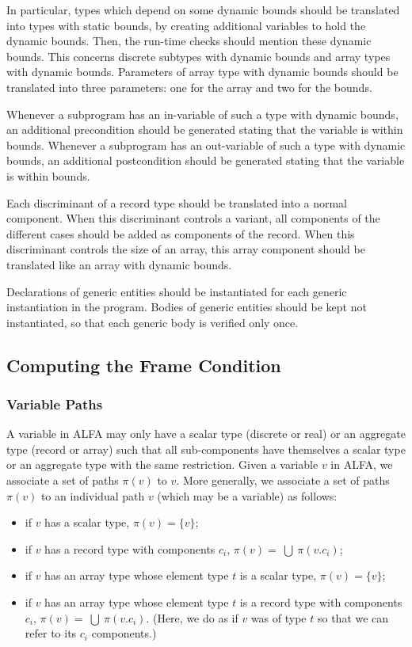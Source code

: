 \documentclass[fullpage]{article}
\newcommand{\bigunion}{~\bigcup~}
\newcommand{\vpath}[1]{\ensuremath{\pi(#1)}\xspace}
\begin{document}
In particular, types which depend on some dynamic bounds should be translated
into types with static bounds, by creating additional variables to hold the
dynamic bounds. Then, the run-time checks should mention these dynamic bounds.
This concerns discrete subtypes with dynamic bounds and array types with
dynamic bounds. Parameters of array type with dynamic bounds should be
translated into three parameters: one for the array and two for the bounds.

Whenever a subprogram has an in-variable of such a type with dynamic bounds, an
additional precondition should be generated stating that the variable is within
bounds.  Whenever a subprogram has an out-variable of such a type with dynamic
bounds, an additional postcondition should be generated stating that the
variable is within bounds.

Each discriminant of a record type should be translated into a normal
component. When this discriminant controls a variant, all components of the
different cases should be added as components of the record. When this
discriminant controls the size of an array, this array component should be
translated like an array with dynamic bounds.

Declarations of generic entities should be instantiated for each generic
instantiation in the program. Bodies of generic entities should be kept not
instantiated, so that each generic body is verified only once.

\subsection{Computing the Frame Condition}
\label{sub:data-flow}

\subsubsection{Variable Paths}
\label{sub:variable-path}

A variable in ALFA may only have a scalar type (discrete or real) or an
aggregate type (record or array) such that all sub-components have themselves a
scalar type or an aggregate type with the same restriction. Given a variable
$v$ in ALFA, we associate a set of paths \vpath{v} to $v$. More generally, we
associate a set of paths \vpath{v} to an individual path $v$ (which may be a
variable) as follows:
\begin{itemize}
\item if $v$ has a scalar type, $\vpath{v} = \{v\}$;
\item if $v$ has a record type with components $c_i$, 
  $\vpath{v} = \bigunion \vpath{v.c_i}$;
\item if $v$ has an array type whose element type $t$ is a scalar type,
  $\vpath{v} = \{v\}$;
\item if $v$ has an array type whose element type $t$ is a record type with
  components $c_i$, $\vpath{v} = \bigunion \vpath{v.c_i}$. (Here, we do as if $v$
  was of type $t$ so that we can refer to its $c_i$ components.)
\end{itemize}
\end{document}
